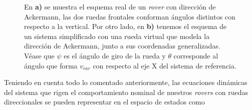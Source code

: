 \begin{figure}[h!]
\begin{minipage}{.3\textwidth}
    \end{minipage}
    \vspace{0.5cm}
    \caption{En \textbf{a)} se muestra el esquema real de un \textit{rover} con dirección de Ackermann, las dos ruedas frontales conforman ángulos distintos con respecto a la vertical. Por otro lado, en \textbf{b)} tenemos el esquema de un sistema simplificado con una rueda virtual que modela la dirección de Ackermann, junto a sus coordenadas generalizadas. Véase que $\psi$ es el ángulo de giro de la rueda y $\theta$ corresponde al ángulo que forma $v_{car}$ con respecto al eje X del sistema de referencia.}
    \label{fig: carlike_notation}
\end{figure}

Teniendo en cuenta todo lo comentado anteriormente, las ecuaciones dinámicas del sistema que rigen el comportamiento nominal de nuestros \textit{rovers} con ruedas direccionales se pueden representar en el espacio de estados como

